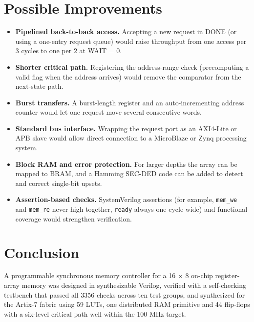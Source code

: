 \documentclass[11pt,a4paper]{article}
\newcommand{\sig}[1]{\texttt{#1}}
\begin{document}
\section{Possible Improvements}
\begin{itemize}[leftmargin=*,itemsep=3pt]
\item \textbf{Pipelined back-to-back access.} Accepting a new request in DONE (or using a one-entry request queue) would raise throughput from one access per 3 cycles to one per 2 at WAIT = 0.
\item \textbf{Shorter critical path.} Registering the address-range check (precomputing a valid flag when the address arrives) would remove the comparator from the next-state path.
\item \textbf{Burst transfers.} A burst-length register and an auto-incrementing address counter would let one request move several consecutive words.
\item \textbf{Standard bus interface.} Wrapping the request port as an AXI4-Lite or APB slave would allow direct connection to a MicroBlaze or Zynq processing system.
\item \textbf{Block RAM and error protection.} For larger depths the array can be mapped to BRAM, and a Hamming SEC-DED code can be added to detect and correct single-bit upsets.
\item \textbf{Assertion-based checks.} SystemVerilog assertions (for example, \sig{mem\_we} and \sig{mem\_re} never high together, \sig{ready} always one cycle wide) and functional coverage would strengthen verification.
\end{itemize}

\section{Conclusion}
A programmable synchronous memory controller for a 16 $\times$ 8 on-chip register-array memory was designed in synthesizable Verilog, verified with a self-checking testbench that passed all 3356 checks across ten test groups, and synthesized for the Artix-7 fabric using 59 LUTs, one distributed RAM primitive and 44 flip-flops with a six-level critical path well within the 100 MHz target.
\end{document}
